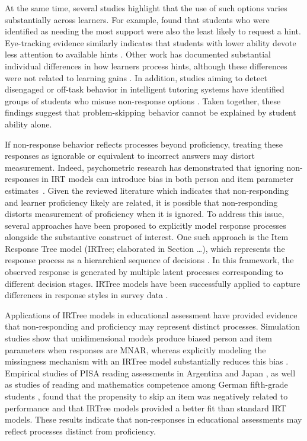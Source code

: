 \documentclass[11pt]{article}
\begin{document}
At the same time, several studies highlight that the use of such options varies substantially across learners. For example, \textcite{norum2024student} found that students who were identified as needing the most support were also the least likely to request a hint. Eye-tracking evidence similarly indicates that students with lower ability devote less attention to available hints \parencite{conati2013understanding}. Other work has documented substantial individual differences in how learners process hints, although these differences were not related to learning gains \parencite{goldin2012learner, goldin2013hints}. In addition, studies aiming to detect disengaged or off-task behavior in intelligent tutoring systems have identified groups of students who misuse non-response options \parencite{baker2004off, baker2004detecting, baker2005performance, beck2004using}. Taken together, these findings suggest that problem-skipping behavior cannot be explained by student ability alone.

If non-response behavior reflects processes beyond proficiency, treating these responses as ignorable or equivalent to incorrect answers may distort measurement. Indeed, psychometric research has demonstrated that ignoring non-responses in IRT models can introduce bias in both person and item parameter estimates~\parencite{finch2008estimation, mislevy1996missing, pohl2014dealing, holman2005modelling, debeer2017modeling}. Given the reviewed literature which indicates that non-responding and learner proficiency likely are related, it is possible that non-responding distorts measurement of proficiency when it is ignored. To address this issue, several approaches have been proposed to explicitly model response processes alongside the substantive construct of interest. One such approach is the Item Response Tree model (IRTree; elaborated in Section \dots), which represents the response process as a hierarchical sequence of decisions \parencite{bockenholt2012modeling, de2012irtrees, thissen2013two}. In this framework, the observed response is generated by multiple latent processes corresponding to different decision stages. IRTree models have been successfully applied to capture differences in response styles in survey data \parencite{bockenholt2017response, thissen2013two}.

Applications of IRTree models in educational assessment have provided evidence that non-responding and proficiency may represent distinct processes. Simulation studies show that unidimensional models produce biased person and item parameters when responses are MNAR, whereas explicitly modeling the missingness mechanism with an IRTree model substantially reduces this bias \parencite{debeer2017modeling}. Empirical studies of PISA reading assessments in Argentina \parencite{debeer2017modeling} and Japan \parencite{okumura2014empirical}, as well as studies of reading and mathematics competence among German fifth-grade students \parencite{pohl2014dealing}, found that the propensity to skip an item was negatively related to performance and that IRTree models provided a better fit than standard IRT models. These results indicate that non-responses in educational assessments may reflect processes distinct from proficiency.
\end{document}

